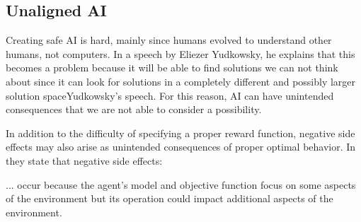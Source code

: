 \documentclass[12pt,A4]{report}
\newcommand{\autobaj}{}
\theoremstyle{definition}
\begin{document}




\subsection{Unaligned AI}
Creating safe AI is hard, mainly since humans evolved to understand other humans, not computers. In a speech by Eliezer Yudkowsky, he explains that this becomes a problem because it will be able to find solutions we can not think about since it can look for solutions in a completely different and possibly larger solution space\autobaj{Yudkowsky's speech}. For this reason, AI can have unintended consequences that we are not able to consider a possibility. 

In addition to the difficulty of specifying a proper reward function, negative side effects may also arise as unintended consequences of proper optimal behavior. In \citet{Saisubramanian} they state that negative side effects:
\begin{displayquote}
  ... occur because the agent's model and objective function focus on some aspects of the environment but its operation could impact additional aspects of the environment.
\end{displayquote}
\end{document}
